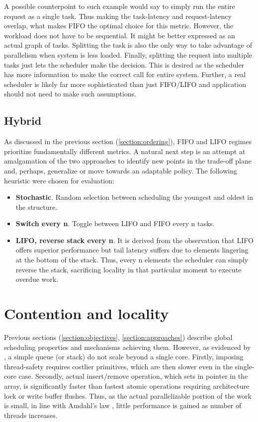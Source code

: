 \documentclass[12pt,a4paper,twoside]{report}
\begin{document}
A possible counterpoint to such example would say to simply run the entire request as a single task. Thus making the task-latency and request-latency overlap, what makes FIFO the optimal choice for this metric. However, the workload does not have to be sequential. It might be better expressed as an actual graph of tasks. Splitting the task is also the only way to take advantage of parallelism when system is less loaded. Finally, splitting the request into multiple tasks just lets the scheduler make the decision. This is desired as the scheduler has more information to make the correct call for entire system. Further, a real scheduler is likely far more sophisticated than just FIFO/LIFO and application should not need to make such assumptions. 

\subsection{Hybrid}
As discussed in the previous section (\ref{section:ordering}), FIFO and LIFO regimes prioritize fundamentally different metrics. A natural next step is an attempt at amalgamation of the two approaches to identify new points in the trade-off plane and, perhaps, generalize or move towards an adaptable policy. The following heuristic were chosen for evaluation: 


\begin{itemize}
    \item \textbf{Stochastic}. Random selection between scheduling the youngest and oldest in the structure. 
    \item \textbf{Switch every n}. Toggle between LIFO and FIFO every n tasks.
    \item \textbf{LIFO, reverse stack every n}. It is derived from the observation that LIFO offers superior performance but tail latency suffers due to elements lingering at the bottom of the stack. Thus, every n elements the scheduler can simply reverse the stack, sacrificing locality in that particular moment to execute overdue work.    
\end{itemize}

\section{Contention and locality}
\label{section:global_local}


Previous sections (\ref{section:objectives}, \ref{section:approaches}) describe global scheduling properties and mechanisms achieving them. However, as evidenced by , a simple queue (or stack) do not scale beyond a single core. Firstly, imposing thread-safety requires costlier primitives, which are then slower even in the single-core case.
Secondly, actual insert/remove operation, which sets in pointer in the array, is significantly faster than fastest atomic operations requiring architecture lock or write buffer flushes. Thus, as the actual parallelizable portion of the work is small, in line with Amdahl's law \cite{amdahl}, little performance is gained as number of threads increases. 
\end{document}
